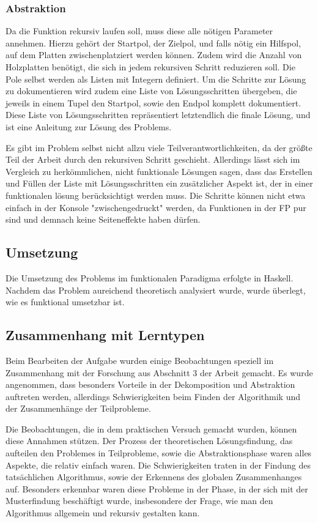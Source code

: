 \subsubsection{Abstraktion}

Da die Funktion rekursiv laufen soll, muss diese alle nötigen Parameter annehmen. Hierzu gehört der Startpol, der Zielpol, und falls nötig ein Hilfspol, auf dem Platten zwischenplatziert werden können. Zudem wird die Anzahl von Holzplatten benötigt, die sich in jedem rekursiven Schritt reduzieren soll. Die Pole selbst werden als Listen mit Integern definiert.
Um die Schritte zur Lösung zu dokumentieren wird zudem eine Liste von Lösungsschritten übergeben, die jeweils in einem Tupel den Startpol, sowie den Endpol komplett dokumentiert. Diese Liste von Lösungsschritten repräsentiert letztendlich die finale Lösung, und ist eine Anleitung zur Lösung des Problems.

Es gibt im Problem selbst nicht allzu viele Teilverantwortlichkeiten, da der größte Teil der Arbeit durch den rekursiven Schritt geschieht. Allerdings lässt sich im Vergleich zu herkömmlichen, nicht funktionale Lösungen sagen, dass das Erstellen und Füllen der Liste mit Lösungsschritten ein zusätzlicher Aspekt ist, der in einer funktionalen lösung berücksichtigt werden muss. Die Schritte können nicht etwa einfach in der Konsole "zwischengedruckt" werden, da Funktionen in der FP pur sind und demnach keine Seiteneffekte haben dürfen.

\subsection{Umsetzung}

Die Umsetzung des Problems im funktionalen Paradigma erfolgte in Haskell. Nachdem das Problem aureichend theoretisch analysiert wurde, wurde überlegt, wie es funktional umsetzbar ist.

\subsection{Zusammenhang mit Lerntypen}
Beim Bearbeiten der Aufgabe wurden einige Beobachtungen speziell im Zusammenhang mit der Forschung aus Abschnitt 3 der Arbeit gemacht. Es wurde angenommen, dass besonders Vorteile in der Dekomposition und Abstraktion auftreten werden, allerdings Schwierigkeiten beim Finden der Algorithmik und der Zusammenhänge der Teilprobleme.

Die Beobachtungen, die in dem praktischen Versuch gemacht wurden, können diese Annahmen stützen. Der Prozess der theoretischen Lösungsfindung, das aufteilen den Problemes in Teilprobleme, sowie die Abstraktionsphase waren alles Aspekte, die relativ einfach waren. Die Schwierigkeiten traten in der Findung des tatsächlichen Algorithmus, sowie der Erkennens des globalen Zusammenhanges auf. Besonders erkennbar waren diese Probleme in der Phase, in der sich mit der Musterfindung beschäftigt wurde, insbesondere der Frage, wie man den Algorithmus allgemein und rekursiv gestalten kann.
